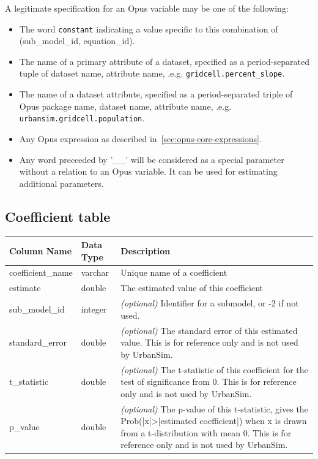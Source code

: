 A legitimate specification for an Opus variable may be one of the following:

\begin{itemize}

\item The word \verb|constant| indicating a value specific to this combination
of (sub_model_id, equation_id).

\item The name of a primary attribute of a dataset, specified as a period-separated
tuple of dataset name, attribute name, .e.g.
\verb|gridcell.percent_slope|.

\item The name of a dataset attribute, specified as a period-separated triple of
Opus package name, dataset name, attribute name, .e.g. \verb|urbansim.gridcell.population|.

\item Any Opus expression as described in~\ref{sec:opus-core-expressions}.
 
\item Any word preceeded by '__' will be considered as a special parameter without a relation to an Opus variable.
It can be used for estimating additional parameters.
\end{itemize}

\subsection{Coefficient table}

\begin{tabular}{llp{4.5in}}

\textbf{Column Name} & \textbf{Data Type} & \textbf{Description} \\

\hline
coefficient_name & varchar & Unique name of a coefficient  \\

\hline
estimate & double & The estimated value of this coefficient \\

\hline
sub_model_id & integer &  \emph{(optional)} Identifier for a submodel, or
-2 if not used. \\

\hline
standard_error & double & \emph{(optional) }
The standard error of this estimated value. This is for reference only and is
not used by UrbanSim.  \\

\hline
t_statistic & double & \emph{(optional) }
The t-statistic of this coefficient for the test of significance from 0. This
is for reference only and is not used by UrbanSim.  \\

\hline p_value & double & \emph{(optional) } The p-value of this t-statistic,
gives the Prob(|x|\textgreater{}|estimated coefficient|) when x is drawn from a
t-distribution with mean 0. This is for reference only and is not used by
UrbanSim.   \\

\hline

\end{tabular}

